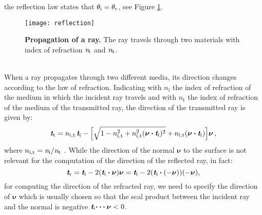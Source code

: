 the reflection law states that $\theta_\textrm{i}=\theta_\textrm{r}$, see Figure \ref{fig:Snell}.
\begin{figure}[t]
 \label{fig:Snell}
     \begin{center}
     \texttt{[image: reflection]}
     \end{center}
     \caption{\textbf{Propagation of a ray.} The ray travels through two materials with index of refraction $\textit{n}_\textrm{i}$ and $\textit{n}_\textrm{t}$.}%
\label{fig:Snell}
 \end{figure}
\\ \indent When a ray propagates through two different media, its direction changes according to the law of refraction. 
Indicating with $n_\textrm{i}$ the index of refraction of the medium in which the incident ray travels and with 
$n_\textrm{t}$ the index of refraction of the medium of the transmitted ray, the direction of the transmitted ray is given by:
\begin{equation}\label{Refraction}
\textit{\textbf{t}}_\textrm{t} = n_{\textrm{i},\textrm{t}}\,\textit{\textbf{t}}_\textrm{i}-
\Big[\sqrt{1-n_{\textrm{i},\textrm{t}}^2+
n_{\textrm{i},\textrm{t}}^2(\boldsymbol{\nu}\boldsymbol{\cdot}\textit{\textbf{t}}_\textrm{i})^2}
+n_{\textrm{i},\textrm{t}}(\boldsymbol{\nu}\boldsymbol{\cdot}\textit{\textbf{t}}_\textrm{i}) \Big]\boldsymbol{\nu}\,,
\end{equation}
where $n_{\textrm{i},\textrm{t}}=\textit{n}_\textrm{i}/\textit{n}_\textrm{t}$ \cite{chaves2015introduction}.
While the direction of the normal $\boldsymbol{\nu}$ to the surface is not relevant for the computation of the direction of the reflected ray, in fact:
\begin{equation}
\textit{\textbf{t}}_\textrm{r} = \textit{\textbf{t}}_\textrm{i}-2(\textit{\textbf{t}}_\textrm{i}\boldsymbol{\cdot}\boldsymbol{\nu})\boldsymbol{\nu}= \textit{\textbf{t}}_\textrm{i}-2(\textit{\textbf{t}}_\textrm{i}\boldsymbol{\cdot}(-\boldsymbol{\nu}))(-\boldsymbol{\nu}), 
\end{equation}
for computing the direction of the refracted ray, we need to specify the direction of $\boldsymbol{\nu}$ which is usually chosen so that the scal product between the incident ray and the normal is negative $\textit{\textbf{t}}_{\textrm{i}}\boldsymbol{\cdots}\boldsymbol{\nu}<0$. 
